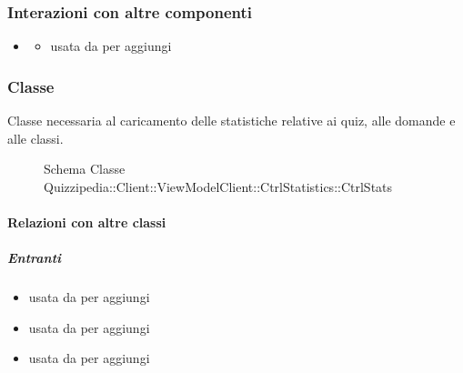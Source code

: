 \subsubsection{Interazioni con altre componenti}
\begin{itemize}
\item {}
\begin{itemize}
\item usata da  per aggiungi
\end{itemize}
\end{itemize}
\subsubsection{Classe }
Classe necessaria al caricamento delle statistiche relative ai quiz, alle domande e alle classi.
\begin{figure}[H]
\centering
\noindent{}
\caption[Schema Classe CtrlStats]{Schema Classe Quizzipedia::Client::ViewModelClient::CtrlStatistics::CtrlStats}
\end{figure}
\paragraph{Relazioni con altre classi}
\subparagraph{Entranti}
\begin{itemize}
\item usata da  per aggiungi
\item usata da  per aggiungi
\item usata da  per aggiungi
\end{itemize}

